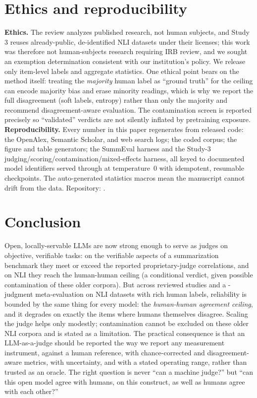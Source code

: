 \section{Ethics and reproducibility}
\textbf{Ethics.} The review analyzes published research, not human subjects, and Study 3 reuses already-public,
de-identified NLI datasets under their licenses; this work was therefore not human-subjects research requiring IRB
review, and we sought an exemption determination consistent with our institution's policy. We release only
item-level labels and aggregate statistics. One ethical point bears on the method itself: treating the
\emph{majority} human label as ``ground truth'' for the ceiling can encode majority bias and erase minority readings,
which is why we report the full disagreement (soft labels, entropy) rather than only the majority and recommend
disagreement-aware evaluation. The contamination screen is reported precisely so ``validated'' verdicts are not
silently inflated by pretraining exposure.
\textbf{Reproducibility.} Every number in this paper regenerates from released code: the OpenAlex, Semantic Scholar,
and web search logs; the coded corpus; the figure and table generators; the SummEval harness and the
Study-3 judging/scoring/contamination/mixed-effects harness, all keyed to documented model identifiers served through
\PROVIDER{} at temperature~$0$ with idempotent, resumable checkpoints. The auto-generated statistics macros
mean the manuscript cannot drift from the data. Repository: \REPO{}.

\section{Conclusion}
Open, locally-servable LLMs are now strong enough to serve as judges on objective, verifiable tasks: on the
verifiable aspects of a summarization benchmark they meet or exceed the reported proprietary-judge correlations, and
on NLI they reach the human-human ceiling (a conditional verdict, given possible contamination of these older corpora). But across \Nstudies{} reviewed studies and a
\NLInjudg{}-judgment meta-evaluation on NLI datasets with rich human labels, reliability is bounded by the same thing
for every model: the \emph{human-human agreement ceiling}, and it degrades on exactly the items where humans
themselves disagree. Scaling the judge helps only modestly; contamination cannot be excluded on these older NLI corpora and is stated as a limitation. The
practical consequence is that an LLM-as-a-judge should be reported the way we report any measurement instrument,
against a human reference, with chance-corrected and disagreement-aware metrics, with uncertainty, and with a stated
operating range, rather than trusted as an oracle. The right question is never ``can a machine judge?'' but ``can
this open model agree with humans, on this construct, as well as humans agree with each other?''
